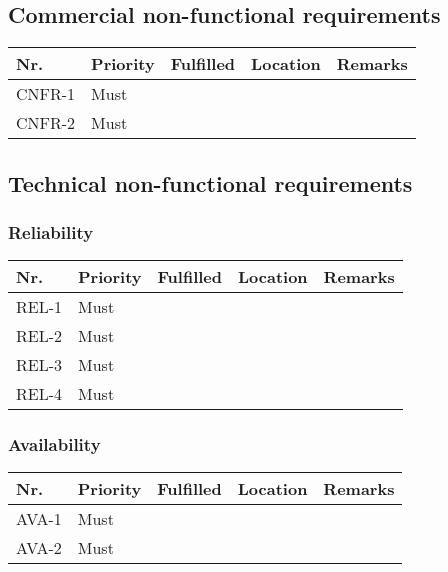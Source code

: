 \begin{table}[H]
\begin{tabular}{lllll}
	\end{tabular}
\end{table}

\subsection{Commercial non-functional requirements}
\begin{table}[H]
	\begin{tabular}{lllll}
						    
		Nr.    & Priority & Fulfilled & Location & Remarks \\ \hline
		CNFR-1 & Must     & ~        & ~         & ~       \\ 
		CNFR-2 & Must     & ~        & ~         & ~       \\
						
	\end{tabular}
\end{table}

\subsection{Technical non-functional requirements}
\subsubsection{Reliability}
\begin{table}[H]
	\begin{tabular}{lllll}
						    
		Nr.   & Priority & Fulfilled & Location & Remarks \\ \hline
		REL-1 & Must     & ~        & ~         & ~       \\ 
		REL-2 & Must     & ~        & ~         & ~       \\ 
		REL-3 & Must     & ~        & ~         & ~       \\ 
		REL-4 & Must     & ~        & ~         & ~       \\
						
	\end{tabular}
\end{table}

\subsubsection{Availability}
\begin{table}[H]
	\begin{tabular}{lllll}
						    
		Nr.   & Priority & Fulfilled & Location & Remarks \\ \hline
		AVA-1 & Must     & ~        & ~         & ~       \\ 
		AVA-2 & Must     & ~        & ~         & ~       \\
						
	\end{tabular}
\end{table}

